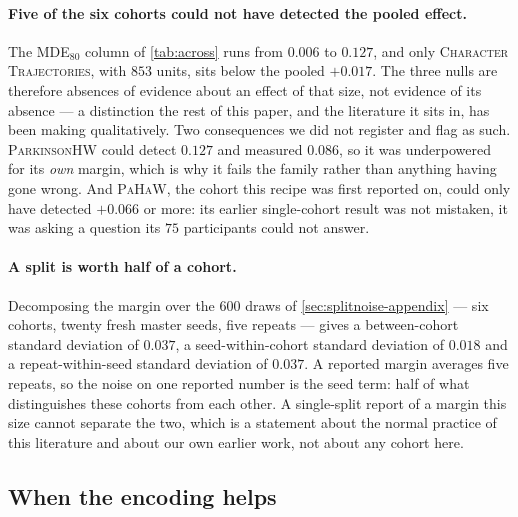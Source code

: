 \documentclass[10pt,a4paper]{article}
\begin{document}
\paragraph{Five of the six cohorts could not have detected the pooled effect.} The MDE$_{80}$
column of \cref{tab:across} runs from $0.006$ to $0.127$, and only \textsc{Character Trajectories},
with $853$ units, sits below the pooled $+0.017$. The three nulls are therefore absences of
evidence about an effect of that size, not evidence of its absence --- a distinction the rest of
this paper, and the literature it sits in, has been making qualitatively. Two consequences we did
not register and flag as such. \textsc{ParkinsonHW} could detect $0.127$ and measured $0.086$, so
it was underpowered for its \emph{own} margin, which is why it fails the family rather than
anything having gone wrong. And \textsc{PaHaW}, the cohort this recipe was first reported on, could
only have detected $+0.066$ or more: its earlier single-cohort result was not mistaken, it was
asking a question its $75$ participants could not answer.

\paragraph{A split is worth half of a cohort.} Decomposing the margin over the $600$ draws of
\cref{sec:splitnoise-appendix} --- six cohorts, twenty fresh master seeds, five repeats --- gives a
between-cohort standard deviation of $0.037$, a seed-within-cohort standard deviation of $0.018$ and
a repeat-within-seed standard deviation of $0.037$. A reported margin averages five repeats, so the
noise on one reported number is the seed term: half of what distinguishes these cohorts from each
other. A single-split report of a margin this size cannot separate the two, which is a statement
about the normal practice of this literature and about our own earlier work, not about any cohort
here.

\subsection{When the encoding helps}
\label{sec:when}
\end{document}
